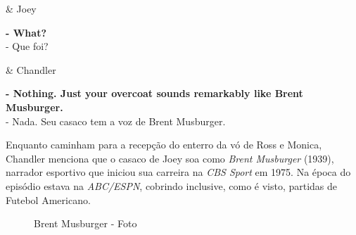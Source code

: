 \begin{tcolorbox}[enhanced,center upper,
    drop fuzzy shadow southeast, boxrule=0.3pt,
    lower separated=false,
    colframe=black!30!dialogoBorder,colback=white]
\begin{minipage}[c]{0.16\linewidth}
   & \centering \scriptsize{Joey}
\end{minipage}
\hfill
\begin{minipage}[c]{0.8\linewidth}
  \textbf{- What?}\\
  - Que foi?
\end{minipage}

\medskip
\begin{minipage}[c]{0.16\linewidth}
   & \centering \scriptsize{Chandler}
\end{minipage}
\hfill
\begin{minipage}[c]{0.8\linewidth}
  \textbf{- Nothing. Just your overcoat sounds remarkably like Brent Musburger.}\\
  - Nada. Seu casaco tem a voz de Brent Musburger.
\end{minipage}
\end{tcolorbox}

Enquanto caminham para a recepção do enterro da vó de Ross e Monica,
Chandler menciona que o casaco de Joey soa como \emph{Brent Musburger}
(1939), narrador esportivo que iniciou sua carreira na \emph{CBS Sport}
em 1975. Na época do episódio estava na \emph{ABC/ESPN}, cobrindo
inclusive, como é visto, partidas de Futebol Americano.

\begin{figure}
  \centering
    \caption{Brent Musburger - Foto\label{fig:brent-musburger-foto}}
\end{figure}

